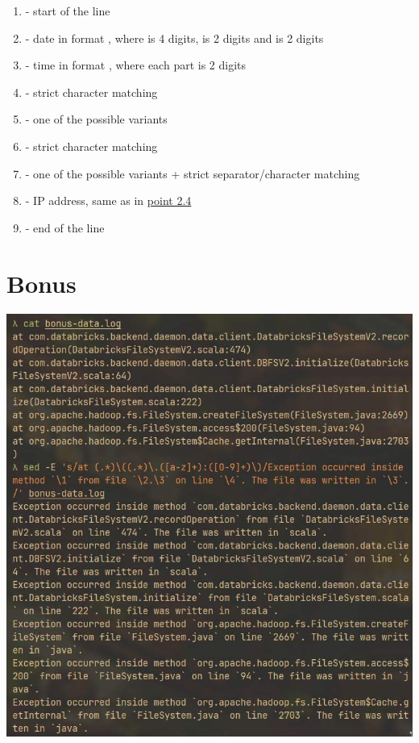 \documentclass{article}
\begin{document}
\begin{enumerate}
	\item \codeword{^} - start of the line
	\item {} - date in format , where  is 4 digits,  is 2 digits and  is 2 digits
	\item {} - time in format , where each part is 2 digits
	\item {} - strict character matching
	\item {} - one of the possible variants
	\item {} - strict character matching
	\item {} - one of the possible variants + strict separator/character matching
  \item {} - IP address, same as in \hyperref[sec:strict]{point 2.4}
  \item \codeword{$} - end of the line
\end{enumerate}

\section{Bonus}
\noindent

\includegraphics[width=460pt]{3_bon-1.jpg}
\newline
\end{document}
